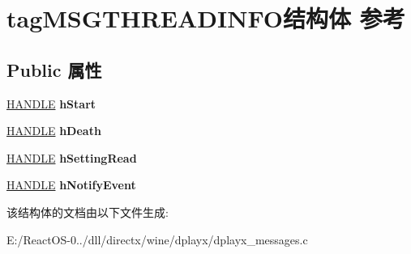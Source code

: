 \hypertarget{structtag_m_s_g_t_h_r_e_a_d_i_n_f_o}{}\section{tag\+M\+S\+G\+T\+H\+R\+E\+A\+D\+I\+N\+F\+O结构体 参考}
\label{structtag_m_s_g_t_h_r_e_a_d_i_n_f_o}
\subsection*{Public 属性}
\begin{DoxyCompactItemize}
\item 
\mbox{\label{structtag_m_s_g_t_h_r_e_a_d_i_n_f_o_a1d0c6b87fcdf0089924fdcea955f759c}} 
\hyperlink{interfacevoid}{H\+A\+N\+D\+LE} {\bfseries h\+Start}
\item 
\mbox{\label{structtag_m_s_g_t_h_r_e_a_d_i_n_f_o_a6f39dedcc4a80bf2b249aff759f5f58a}} 
\hyperlink{interfacevoid}{H\+A\+N\+D\+LE} {\bfseries h\+Death}
\item 
\mbox{\label{structtag_m_s_g_t_h_r_e_a_d_i_n_f_o_a355f977592c31525f237da5615ccbe82}} 
\hyperlink{interfacevoid}{H\+A\+N\+D\+LE} {\bfseries h\+Setting\+Read}
\item 
\mbox{\label{structtag_m_s_g_t_h_r_e_a_d_i_n_f_o_add85202e4b5bb18da12619c296fa554e}} 
\hyperlink{interfacevoid}{H\+A\+N\+D\+LE} {\bfseries h\+Notify\+Event}
\end{DoxyCompactItemize}


该结构体的文档由以下文件生成\+:\begin{DoxyCompactItemize}
\item 
E\+:/\+React\+O\+S-\/0../dll/directx/wine/dplayx/dplayx\+\_\+messages.\+c\end{DoxyCompactItemize}
